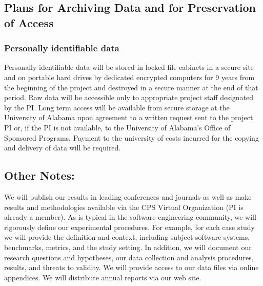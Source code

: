 \subsection*{Plans for Archiving Data and for Preservation of Access}
\subsubsection*{Personally identifiable data} Personally identifiable data will be stored in locked file cabinets in a secure site and on portable hard drives by dedicated encrypted computers for 9 years from the beginning of the project and destroyed in a secure manner at the end of that period. Raw data will be accessible only to appropriate project staff designated by the PI. Long term access will be available from secure storage at the University of Alabama upon agreement to a written request sent to the project PI or, if the PI is not available, to the University of Alabama's Office of Sponsored Programs. Payment to the university of costs incurred for the copying and delivery of data will be required.

\subsection*{Other Notes:}

We will publish our results in leading conferences and journals as well as make results and methodologies available via the CPS Virtual Organization (PI is already a member). As is typical in the software engineering community, we will rigorously define our experimental procedures. For example, for each case study we will provide the definition and context, including subject software systems, benchmarks, metrics, and the study setting. In addition, we will document our research questions and hypotheses, our data collection and analysis procedures, results, and threats to validity. We will provide access to our data files via online appendices.  We will distribute annual reports via our web site.
